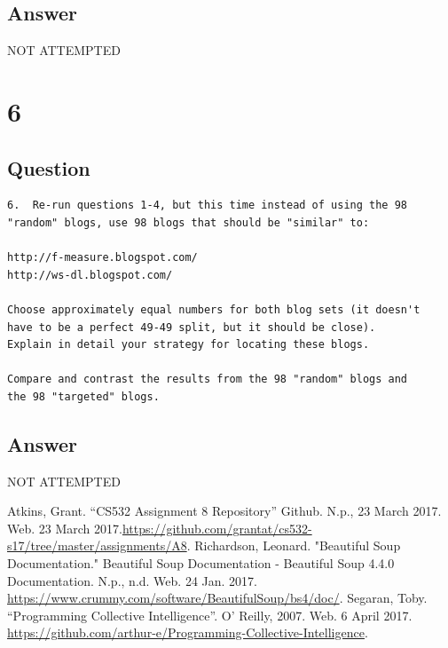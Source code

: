 \documentclass[letterpaper,11pt]{article}
\begin{document}
\subsection*{Answer}

\begin{center}
\Huge{NOT ATTEMPTED}
\end{center}


\clearpage


\section*{6}

\subsection*{Question}

\begin{verbatim}
6.  Re-run questions 1-4, but this time instead of using the 98 
"random" blogs, use 98 blogs that should be "similar" to:

http://f-measure.blogspot.com/
http://ws-dl.blogspot.com/

Choose approximately equal numbers for both blog sets (it doesn't
have to be a perfect 49-49 split, but it should be close).  
Explain in detail your strategy for locating these blogs.  

Compare and contrast the results from the 98 "random" blogs and 
the 98 "targeted" blogs. 
\end{verbatim}

\subsection*{Answer}

\begin{center}
\Huge{NOT ATTEMPTED}
\end{center}


\clearpage



\begin{thebibliography}{9}
Atkins, Grant. ``CS532 Assignment 8 Repository'' Github. N.p., 23 March 2017. Web. 23 March 2017.\url{https://github.com/grantat/cs532-s17/tree/master/assignments/A8}.
Richardson, Leonard. "Beautiful Soup Documentation." Beautiful Soup Documentation - Beautiful Soup 4.4.0 Documentation. N.p., n.d. Web. 24 Jan. 2017. \url{https://www.crummy.com/software/BeautifulSoup/bs4/doc/}.
Segaran, Toby. ``Programming Collective Intelligence''. O' Reilly, 2007. Web. 6 April 2017. \url{https://github.com/arthur-e/Programming-Collective-Intelligence}.
\end{thebibliography}
\end{document}
